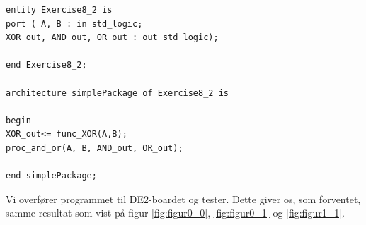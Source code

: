 \begin{enumerate}
\begin{lstlisting}[caption={Kode for test af package},label={lst:opg1_2test}]
entity Exercise8_2 is 
port ( A, B : in std_logic;
XOR_out, AND_out, OR_out : out std_logic);

end Exercise8_2;

architecture simplePackage of Exercise8_2 is

begin 
XOR_out<= func_XOR(A,B);
proc_and_or(A, B, AND_out, OR_out);

end simplePackage;

\end{lstlisting}

Vi overfører programmet til DE2-boardet og tester. Dette giver os, som forventet, samme resultat som vist på figur \ref{fig:figur0_0}, \ref{fig:figur0_1} og \ref{fig:figur1_1}.

\end{enumerate}
